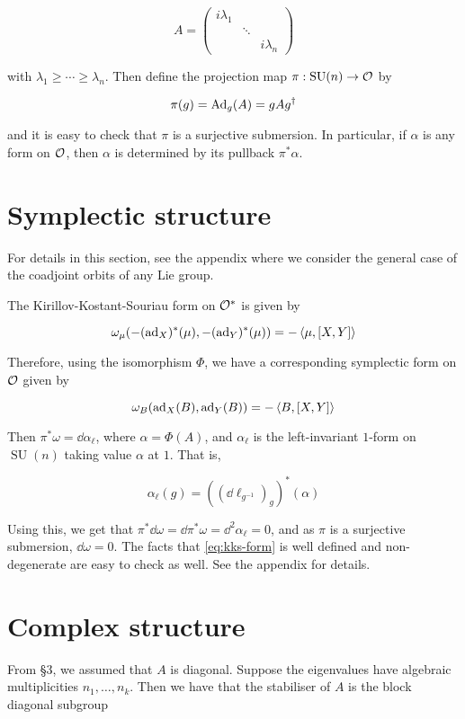 \documentclass{article}
\DeclareMathOperator{\SU}{SU}
\begin{document}
\[A = \begin{pmatrix}
    i\lambda_1 & \\
    & \ddots & \\
    & & i\lambda_n
\end{pmatrix}\]

with \(\lambda_1 \ge \cdots \ge \lambda_n\). Then define the projection map \(\pi : \SU(n) \to \mcO\) by

\[\pi(g) = \operatorname{Ad}_g(A) = gAg^\dagger\]

and it is easy to check that \(\pi\) is a surjective submersion. In particular, if \(\alpha\) is any form on \(\mathcal{O}\), then \(\alpha\) is determined by its pullback \(\pi^*\alpha\).

\section{Symplectic structure}

For details in this section, see the appendix where we consider the general case of the coadjoint orbits of any Lie group.

The Kirillov-Kostant-Souriau form on \(\mathcal{O}^*\) is given by

\[\omega_\mu(-(\operatorname{ad}_X)^*(\mu), -(\operatorname{ad}_Y)^*(\mu)) = -\left\langle \mu, [X, Y] \right\rangle\]

Therefore, using the isomorphism \(\Phi\), we have a corresponding symplectic form on \(\mathcal{O}\) given by

\begin{equation}
    \label{eq:kks-form}
    \omega_B(\operatorname{ad}_X(B), \operatorname{ad}_Y(B)) = -\left\langle B, [X, Y] \right\rangle
\end{equation}

Then \(\pi^*\omega = \dd\alpha_\ell\), where \(\alpha = \Phi(A)\), and \(\alpha_\ell\) is the left-invariant \(1\)-form on \(\SU(n)\) taking value \(\alpha\) at \(1\). That is,

\[\alpha_\ell(g) = ((\dd\ell_{g^{-1}})_g)^*(\alpha)\]

Using this, we get that \(\pi^*\dd\omega = \dd\pi^*\omega = \dd^2\alpha_\ell = 0\), and as \(\pi\) is a surjective submersion, \(\dd\omega = 0\). The facts that \cref{eq:kks-form} is well defined and non-degenerate are easy to check as well. See the appendix for details.

\section{Complex structure}

From \S 3, we assumed that \(A\) is diagonal. Suppose the eigenvalues have algebraic multiplicities \(n_1, \dots, n_k\). Then we have that the stabiliser of \(A\) is the block diagonal subgroup
\end{document}
